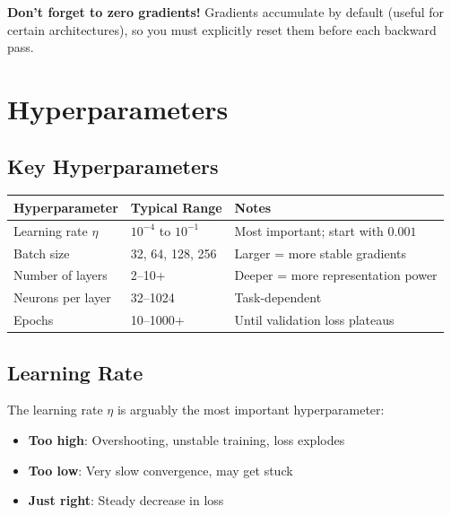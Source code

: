 \begin{important}
\textbf{Don't forget to zero gradients!} Gradients accumulate by default (useful for certain architectures), so you must explicitly reset them before each backward pass.
\end{important}

\section{Hyperparameters}

\subsection{Key Hyperparameters}

\begin{center}
\begin{tabular}{lll}
\toprule
\textbf{Hyperparameter} & \textbf{Typical Range} & \textbf{Notes} \\
\midrule
Learning rate $\eta$ & $10^{-4}$ to $10^{-1}$ & Most important; start with $0.001$ \\
Batch size & 32, 64, 128, 256 & Larger = more stable gradients \\
Number of layers & 2--10+ & Deeper = more representation power \\
Neurons per layer & 32--1024 & Task-dependent \\
Epochs & 10--1000+ & Until validation loss plateaus \\
\bottomrule
\end{tabular}
\end{center}

\subsection{Learning Rate}

The learning rate $\eta$ is arguably the most important hyperparameter:

\begin{itemize}
    \item \textbf{Too high}: Overshooting, unstable training, loss explodes
    \item \textbf{Too low}: Very slow convergence, may get stuck
    \item \textbf{Just right}: Steady decrease in loss
\end{itemize}

